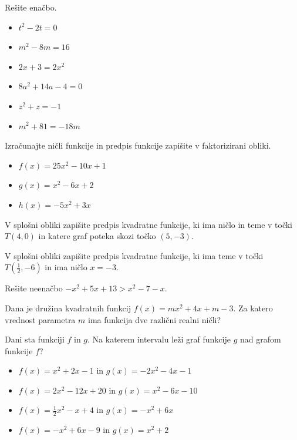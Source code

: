\begin{naloga}
    Rešite enačbo.
    \begin{itemize}
        \item $t^2-2t=0$
        \item $m^2-8m=16$
        \item $2x+3=2x^2$
        \item $8a^2+14a-4=0$
        \item $z^2+z=-1$
        \item $m^2+81=-18m$
    \end{itemize}
\end{naloga}

\begin{naloga}
    Izračunajte ničli funkcije in predpis funkcije zapišite v faktorizirani obliki.
    \begin{itemize}
        \item $f(x)=25x^2-10x+1$
        \item $g(x)=x^2-6x+2$
        \item $h(x)=-5x^2+3x$
    \end{itemize}
\end{naloga}

\begin{naloga}
    V splošni obliki zapišite predpis kvadratne funkcije, ki ima ničlo in teme v točki $T(4,0)$ in katere graf poteka skozi točko $(5,-3)$.
\end{naloga}

\begin{naloga}
    V splošni obliki zapišite predpis kvadratne funkcije, ki ima teme v točki $T(\frac{1}{2},-6)$ in ima ničlo $x=-3$.
\end{naloga}

\begin{naloga}
    Rešite neenačbo $-x^2+5x+13>x^2-7-x$.
\end{naloga}

\begin{naloga}
    Dana je družina kvadratnih funkcij $f(x)=mx^2+4x+m-3$. Za katero vrednost parametra $m$ ima funkcija dve različni realni ničli?
\end{naloga}

\begin{naloga}
    Dani sta funkciji $f$ in $g$. Na katerem intervalu leži graf funkcije $g$ nad grafom funkcije $f$?
    \begin{itemize}
        \item $f(x)=x^2+2x-1$ in $g(x)=-2x^2-4x-1$
        \item $f(x)=2x^2-12x+20$ in $g(x)=x^2-6x-10$
        \item $f(x)=\frac{1}{2}x^2-x+4$ in $g(x)=-x^2+6x$
        \item $f(x)=-x^2+6x-9$ in $g(x)=x^2+2$
    \end{itemize}
\end{naloga}

